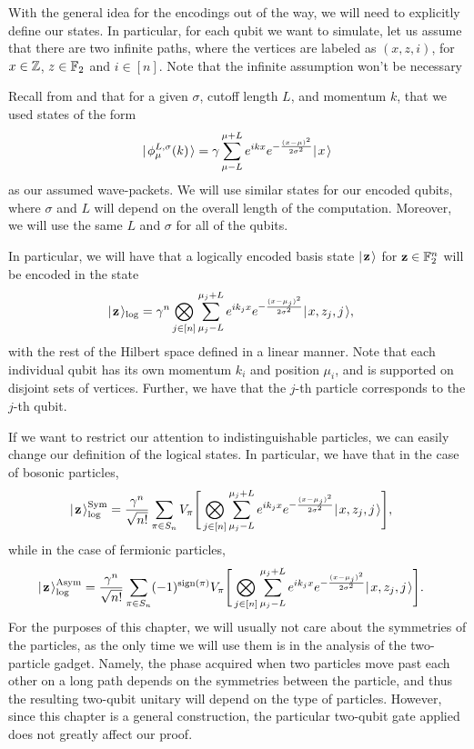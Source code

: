 \documentclass[../thesis-main/thesis-main]{subfiles}
\begin{document}
With the general idea for the encodings out of the way, we will need to explicitly define our states.  In particular, for each qubit we want to simulate, let us assume that there are two infinite paths, where the vertices are labeled as $(x,z,i)$, for $x\in \mathbb{Z}$, $z\in \mathbb{F}_2$ and $i\in[n]$.  Note that the infinite assumption won't be necessary 

Recall from  and  that for a given $\sigma$, cutoff length $L$, and momentum $k$, that we used states of the form
\begin{align}
    |\mspace{2mu} \phi_\mu^{L,\sigma}(k) \mspace{2mu} \rangle = \gamma \sum_{\mu - L}^{\mu + L} e^{ikx} e^{-\frac{(x-\mu)^2}{2\sigma^2}} |\mspace{2mu} x \mspace{2mu} \rangle
\end{align}
as our assumed wave-packets.  We will use similar states for our encoded qubits, where $\sigma$ and $L$ will depend on the overall length of the computation.  Moreover, we will use the same $L$ and $\sigma$ for all of the qubits.

In particular, we will have that a logically encoded basis state $|\mspace{2mu} \mathbf{z} \mspace{2mu} \rangle$ for $\mathbf{z}\in \mathbb{F}_2^n$ will be encoded in the state
\begin{align}
  |\mspace{2mu} \mathbf{z} \mspace{2mu} \rangle_{\text{log}} &= \gamma^n \bigotimes_{j\in [n]} \sum_{\mu_j-L}^{\mu_j+L} e^{i k_j x} e^{- \frac{(x - \mu_j)^2}{2\sigma^2}} |\mspace{2mu} x,z_j,j \mspace{2mu} \rangle,\label{eq:MP_u_logical states}
\end{align}
with the rest of the Hilbert space defined in a linear manner.  Note that each individual qubit has its own momentum $k_i$ and position $\mu_i$, and is supported on disjoint sets of vertices.  Further, we have that the $j$-th particle corresponds to the $j$-th qubit.

If we want to restrict our attention to indistinguishable particles, we can easily change our definition of the logical states.  In particular, we have that in the case of bosonic particles,
\begin{align}
  |\mspace{2mu} \mathbf{z} \mspace{2mu} \rangle_{\text{log}}^{\operatorname{Sym}} &= \frac{\gamma^n}{\sqrt{n!}}\sum_{\pi\in S_n} V_\pi \Bigg[\bigotimes_{j\in [n]} \sum_{\mu_j-L}^{\mu_j+L} e^{i k_j x} e^{- \frac{(x - \mu_j)^2}{2\sigma^2}} |\mspace{2mu} x,z_j,j \mspace{2mu} \rangle\Bigg],
\end{align}
while in the case of fermionic particles,
\begin{align}
  |\mspace{2mu} \mathbf{z} \mspace{2mu} \rangle_{\text{log}}^{\operatorname{Asym}} &= \frac{\gamma^n}{\sqrt{n!}}\sum_{\pi\in S_n} (-1)^{\operatorname{sign}(\pi)}V_\pi \Bigg[\bigotimes_{j\in [n]} \sum_{\mu_j-L}^{\mu_j+L} e^{i k_j x} e^{- \frac{(x - \mu_j)^2}{2\sigma^2}} |\mspace{2mu} x,z_j,j \mspace{2mu} \rangle\Bigg].
\end{align}
For the purposes of this chapter, we will usually not care about the symmetries of the particles, as the only time we will use them is in the analysis of the two-particle gadget.  Namely, the phase acquired when two particles move past each other on a long path depends on the symmetries between the particle, and thus the resulting two-qubit unitary will depend on the type of particles.  However, since this chapter is a general construction, the particular two-qubit gate applied does not greatly affect our proof.
\end{document}
